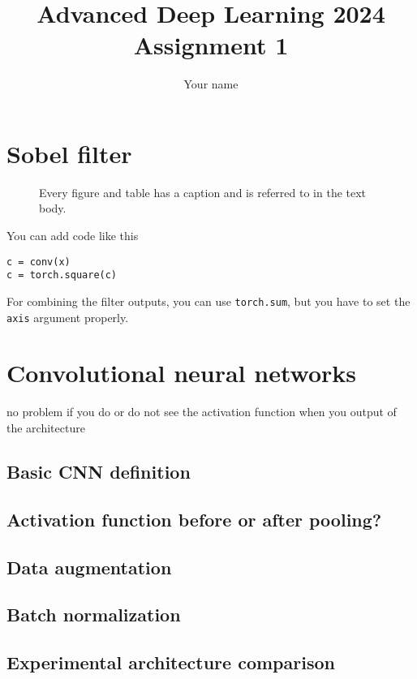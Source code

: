 \documentclass[12pt,a4paper]{article}
\begin{document}
\title{Advanced Deep Learning 2024\\Assignment 1}
\author{\color{red}Your name}
\maketitle

\section{Sobel filter}
\begin{figure}
  \begin{center}
  \end{center}
  \caption{Every figure and table has a caption and is referred to
    in the text body.\label{fig:q6p1}}
\end{figure}



You can add code like this
\begin{lstlisting}
c = conv(x)
c = torch.square(c)
\end{lstlisting}


For combining the filter outputs, you can  use
\lstinline{torch.sum}, but you have to set the \lstinline{axis}
argument properly.

\section{Convolutional neural networks}

no problem if you do or do not see the activation function when you output of the architecture


\subsection{Basic CNN definition}
\subsection{Activation function before or after pooling?}
\subsection{Data augmentation}
\subsection{Batch normalization}
\subsection{Experimental architecture comparison}
\end{document}
